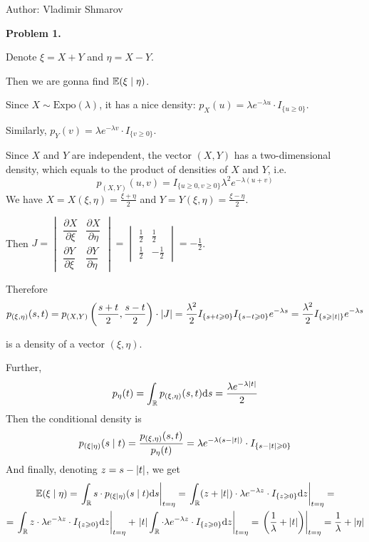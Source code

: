 \documentclass[12pt, a4paper]{article}
\newcommand{\RR}{\mathbb{R}}
\newcommand{\dExpo}{\mathrm{Expo}}
\newcommand{\dz}{\mathrm{d}z}
\DeclarePairedDelimiter{\abs}{\lvert}{\rvert}
\begin{document}
Author: Vladimir Shmarov


\textbf{Problem 1.}\par
Denote $\xi = X + Y$ and $\eta = X - Y$.\par
Then we are gonna find  $\operatorname{\mathbb{E}}(\xi \mid \eta)$.\par
Since $X \sim \dExpo(\lambda)$, it has a nice density: $p_{X}(u) = \lambda e^{-\lambda u}\cdot I_{\{u \geqslant 0\}}$.\par
Similarly, $p_{Y}(v) =  \lambda e^{-\lambda v}\cdot I_{\{v \geqslant 0\}}$.\par
Since $X$ and $Y$ are independent, the vector $(X,Y)$ has a two-dimensional density, which equals to the product of densities of $X$ and $Y$, i.e.
\[
p_{(X,Y)}(u,v) = I_{\{u\geqslant 0, v\geqslant 0\}}\lambda^{2}e^{-\lambda(u+v)}
\]
We have $X = X(\xi, \eta) = \frac{ \xi + \eta}{ 2}$ and $Y = Y(\xi, \eta) = \frac{ \xi - \eta}{ 2}$.\par
Then $J = \begin{vmatrix}\dfrac{ \partial X}{ \partial \xi} & \dfrac{ \partial X}{ \partial \eta}\\ \dfrac{ \partial Y}{ \partial \xi}& \dfrac{ \partial Y}{ \partial \eta}
\end{vmatrix} = \begin{vmatrix}\frac{ 1}{ 2} & \frac{ 1}{ 2}\\ \frac{ 1}{ 2}& -\frac{ 1}{ 2}
\end{vmatrix} = - \frac{ 1}{ 2}$.\par
Therefore
\[
p_{(\xi, \eta)}(s,t) = p_{(X,Y)}\left(\frac{ s+t}{ 2}, \frac{ s-t}{ 2}\right)\cdot \abs{J} = \frac{ \lambda^{2}}{ 2}I_{\{ s + t \geqslant 0\}}I_{\{s - t \geqslant 0\}}e^{-\lambda s} = \frac{ \lambda^{2}}{ 2}I_{\{ s \geqslant \abs{t}\}}e^{-\lambda s}
\]
\par
is a density of a vector $(\xi, \eta)$.\par
Further,
\[
p_{\eta}(t) = \int_{\RR}p_{(\xi, \eta)}(s,t)\mathrm{d}s = \frac{ \lambda e^{-\lambda\abs{t}}}{ 2}
\]
Then the conditional density is
\[
p_{(\xi \mid \eta)}(s \mid t) = \frac{ p_{(\xi, \eta)}(s,t)}{ p_{\eta}(t)} = \lambda e^{-\lambda(s-\abs{t})}\cdot I_{\{s - \abs{t}\geqslant 0\}}
\]
And finally, denoting $z = s - \abs{t}$, we get
\begin{multline}
\E(\xi \mid \eta) = \left.\int_{\RR}s\cdot p_{(\xi \mid \eta)}(s \mid t)\mathrm{d}s\right|_{t = \eta} = \left.\int_{\RR}(z + \abs{t})\cdot\lambda e^{-\lambda z}\cdot I_{\{z\geqslant 0\}}\dz\right|_{t = \eta}  = \\
= \left.\int_{\RR}z\cdot\lambda e^{-\lambda z}\cdot I_{\{z\geqslant 0\}}\dz\right|_{t = \eta} + \left.\abs{t}\int_{\RR}\cdot\lambda e^{-\lambda z}\cdot I_{\{z\geqslant 0\}}\dz\right|_{t = \eta} =  \left.\left(\frac{ 1}{ \lambda} + \abs{t}\right)\right|_{t = \eta} = \frac{ 1}{ \lambda} + \abs{\eta}
\end{multline}
\end{document}
